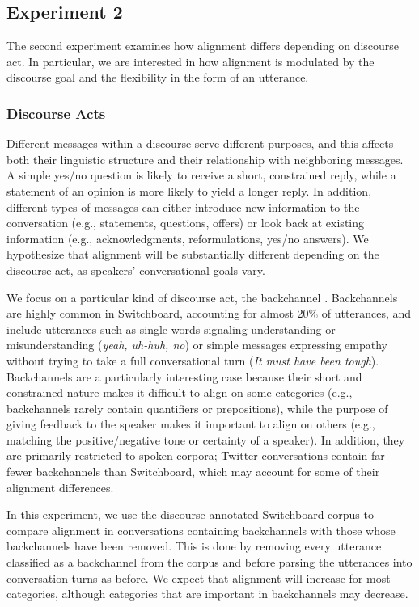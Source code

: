 \documentclass[11pt]{article}
\begin{document}
\subsection{Experiment 2}

The second experiment examines how alignment differs depending on discourse act. In particular, we are interested in how alignment is modulated by the discourse goal and the flexibility in the form of an utterance.

\subsubsection{Discourse Acts}
Different messages within a discourse serve different purposes, and this affects both their linguistic structure and their relationship with neighboring messages.  A simple yes/no question is likely to receive a short, constrained reply, while a statement of an opinion is more likely to yield a longer reply. In addition, different types of messages can either introduce new information to the conversation (e.g., statements, questions, offers) or look back at existing information (e.g., acknowledgments, reformulations, yes/no answers). We hypothesize that alignment will be substantially different depending on the discourse act, as speakers' conversational goals vary.

We focus on a particular kind of discourse act, the backchannel \cite{Yngve1970}. Backchannels are highly common in Switchboard, accounting for almost 20\% of utterances, and include utterances such as single words signaling understanding or misunderstanding (\textit{yeah, uh-huh, no}) or simple messages expressing empathy without trying to take a full conversational turn (\textit{It must have been tough}).  Backchannels are a particularly interesting case because their short and constrained nature makes it difficult to align on some categories (e.g., backchannels rarely contain quantifiers or prepositions), while the purpose of giving feedback to the speaker makes it important to align on others (e.g., matching the positive/negative tone or certainty of a speaker).  In addition, they are primarily restricted to spoken corpora; Twitter conversations contain far fewer backchannels than Switchboard, which may account for some of their alignment differences.

In this experiment, we use the discourse-annotated Switchboard corpus to compare alignment in conversations containing backchannels with those whose backchannels have been removed. This is done by removing every utterance classified as a backchannel from the corpus and before parsing the utterances into conversation turns as before. We expect that alignment will increase for most categories, although categories that are important in backchannels may decrease.
\end{document}
